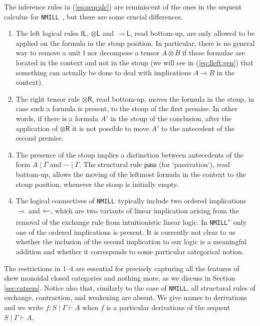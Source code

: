 \documentclass[submission,copyright,creativecommons]{eptcs}
\theoremstyle{definition}
\newcommand{\tl}{\otimes \mathsf{L}}
\newcommand{\tr}{\otimes \mathsf{R}}
\newcommand{\lleft}{{\multimap}\mathsf{L}}
\newcommand{\pass}{\mathsf{pass}}
\newcommand{\unitl}{\mathsf{IL}}
\newcommand{\ot}{\otimes}
\newcommand{\lolli}{\multimap}
\newcommand{\illol}{\rotatebox[origin=c]{180}{$\multimap$}}
\newcommand{\I}{\mathsf{I}}
\newcommand{\NMILL}{\texttt{NMILL}}
\newcommand{\SkNMILL}{\NMILL\textsuperscript{\textit{s}}}
\newcommand{\niccolo}[1]{{\color{red}\textbf{Niccol{\`o}: }#1}}
\begin{document}

The inference rules in (\ref{eq:seqcalc}) are reminiscent of the ones in the sequent calculus for \NMILL\ \cite{abrusci:noncommutative:1990}, but there are some crucial differences.
\begin{enumerate}
\item The left logical rules $\unitl$, $\tl$ and $\lleft$, read bottom-up, are only allowed to be applied on the formula in the stoup position. In particular, there is no general way to remove a unit $\I$ nor decompose a tensor $A \ot B$ if these formulae are located in the context and not in the stoup (we will see in (\ref{eq:lleft:gen}) that something can actually be done to deal with implications $A \lolli B$ in the context).
\item The right tensor rule $\tr$, read bottom-up, moves the formula in the stoup, in case such a formula is present, to the stoup of the first premise. In other words, if there is a formula $A'$ in the stoup of the conclusion, after the application of $\tr$ it is not possible to move $A'$ to the antecedent of the second premise.
\item The presence of the stoup implies a distinction between antecedents of the form $A \mid \Gamma$ and $- \mid \Gamma$. The structural rule $\pass$ (for `passivation`), read bottom-up, allows the moving of the leftmost formula in the context to the stoup position, whenever the stoup is initially empty.
\item The logical connectives of \NMILL\ typically include two ordered implications $\lolli$ and $\illol$, which are two variants of linear implication arising from the removal of the exchange rule from intuitionistic linear logic. In \SkNMILL\ only one of the ordered implications is present. It is currently not clear to us whether the inclusion of the second implication to our logic is a meaningful addition and whether it corresponds to some particular categorical notion.
\end{enumerate}
The restrictions in 1--4 are essential for precisely capturing all the features of skew monoidal closed categories and nothing more, as we discuss in Section \ref{sec:catsem}.
Notice also that, similarly to the case of \NMILL, all structural rules of exchange, contraction, and weakening are absent. We give names to derivations and we write $f : S \mid \Gamma \vdash A$ when $f$ is a particular derivations of the sequent $S \mid \Gamma \vdash A$.
\end{document}
